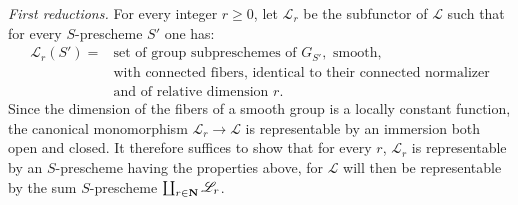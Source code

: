 \par\noindent\emph{First reductions.}
For every integer $r\geq0$, let $\mathscr L_r$ be the subfunctor of $\mathscr L$ such that for every $S$-prescheme $S'$ one has:
\[
\begin{aligned}
\mathscr L_r(S')={}&\text{set of group subpreschemes of }G_{S'},\text{ smooth,}\\
&\text{with connected fibers, identical to their connected normalizer}\\
&\text{and of relative dimension }r.
\end{aligned}
\]
Since the dimension of the fibers of a smooth group is a locally constant function, the canonical monomorphism $\mathscr L_r\to\mathscr L$ is representable by an immersion both open and closed. It therefore suffices to show that for every $r$, $\mathscr L_r$ is representable by an $S$-prescheme having the properties above, for $\mathscr L$ will then be representable by the sum $S$-prescheme $\coprod_{r\in\mathbf{N}}\mathscr L_r$.

